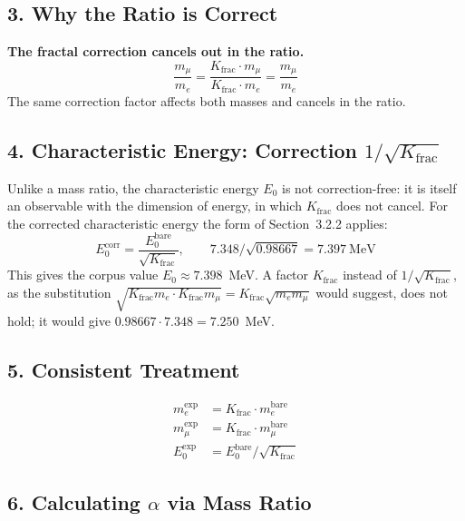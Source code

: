 	\subsection*{3. Why the Ratio is Correct}
	
	\begin{tcolorbox}[colback=green!5!white,colframe=green!75!black]
		\textbf{The fractal correction cancels out in the ratio.}
		\[
		\frac{m_\mu}{m_e} = \frac{K_{\text{frac}} \cdot m_\mu}{K_{\text{frac}} \cdot m_e} = \frac{m_\mu}{m_e}
		\]
		The same correction factor affects both masses and cancels in the ratio.
	\end{tcolorbox}
	
	\subsection*{4. Characteristic Energy: Correction $1/\sqrt{K_{\text{frac}}}$}
	
	Unlike a mass ratio, the characteristic energy $E_0$ is not correction-free: it is itself an observable with the dimension of energy, in which $K_{\text{frac}}$ does not cancel. For the corrected characteristic energy the form of Section~3.2.2 applies:
	\[
	E_0^{\text{corr}} = \frac{E_0^{\text{bare}}}{\sqrt{K_{\text{frac}}}}, \qquad 7.348/\sqrt{0.98667} = 7.397~\text{MeV}
	\]
	This gives the corpus value $E_0 \approx 7.398$~MeV. A factor $K_{\text{frac}}$ instead of $1/\sqrt{K_{\text{frac}}}$, as the substitution $\sqrt{K_{\text{frac}} m_e \cdot K_{\text{frac}} m_\mu} = K_{\text{frac}}\sqrt{m_e m_\mu}$ would suggest, does not hold; it would give $0.98667\cdot7.348 = 7.250$~MeV.
	
	\subsection*{5. Consistent Treatment}
	
	\begin{align*}
		m_e^{\text{exp}} &= K_{\text{frac}} \cdot m_e^{\text{bare}} \\
		m_\mu^{\text{exp}} &= K_{\text{frac}} \cdot m_\mu^{\text{bare}} \\
		E_0^{\text{exp}} &= E_0^{\text{bare}}/\sqrt{K_{\text{frac}}}
	\end{align*}
	
	\subsection*{6. Calculating $\alpha$ via Mass Ratio}
	
